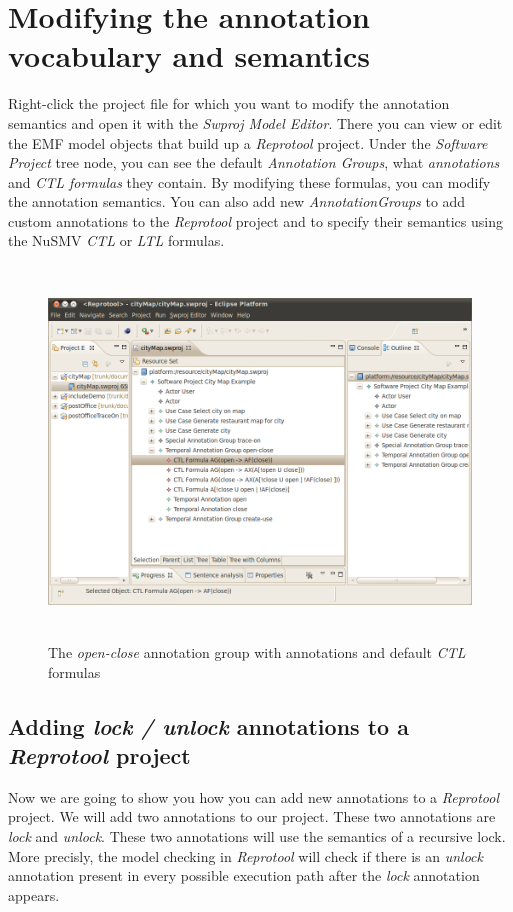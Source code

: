 \section{Modifying the annotation vocabulary and semantics}

Right-click the project file for which you want to modify the annotation semantics and open it with the \emph{Swproj Model Editor}.
There you can view or edit the EMF model objects that build up a \emph{Reprotool} project. Under the \emph{Software Project} tree node,
you can see the default \emph{Annotation Groups}, what \emph{annotations} and \emph{CTL formulas} they contain. By modifying these
formulas, you can modify the annotation semantics. You can also add new \emph{AnnotationGroups} to add custom annotations to the
\emph{Reprotool} project and to specify their semantics using the NuSMV \emph{CTL} or \emph{LTL} formulas.

\begin{figure}[ht]
  \centering
  \includegraphics[height=280pt]{images/reprotoolCTLFormulas}
  \caption{The \emph{open-close} annotation group with annotations and default \emph{CTL} formulas}
  \label{fig:reprotoolCTLFormulas}
\end{figure}

\newpage

\subsection{Adding \emph{lock / unlock} annotations to a \emph{Reprotool} project}
Now we are going to show you how you can add new annotations to a \emph{Reprotool} project. We will add two annotations to our project.
These two annotations are \emph{lock} and \emph{unlock}. These two annotations will use the semantics of a recursive lock. More
precisly, the model checking in \emph{Reprotool} will check if there is an \emph{unlock} annotation present in every possible
execution path after the \emph{lock} annotation appears.

